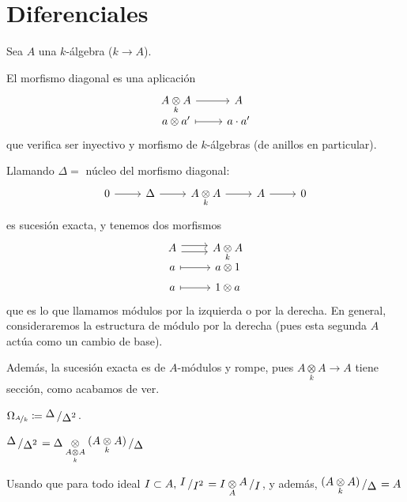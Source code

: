 \section{Diferenciales}
Sea $A$ una $k$-\'algebra ($k \to A$).
\begin{defi}
    El morfismo diagonal es una aplicaci\'on
    $$\bt A \underset{k}{\otimes} A \rar & A \\[-8mm] a\otimes a' \rarmaps & a\cdot a'  \et$$
    que verifica ser inyectivo y morfismo de $k$-\'algebras (de anillos en particular).
\end{defi}
\begin{obs}    
    Llamando $\Delta = $ n\'ucleo del morfismo diagonal:
    $$\bt 0 \rar & \Delta \rar & A \underset{k}{\otimes} A \rar & A \rar & 0 \et$$
    es sucesi\'on exacta, y tenemos dos morfismos
    $$\bt A \rar[shift left=1mm] \rar[shift right=1mm] & A \underset{k}{\otimes} A \\[-8mm] a \rarmaps & a\otimes 1 \\[-5mm] a \rarmaps & 1\otimes a  \et$$
    que es lo que llamamos m\'odulos por la izquierda o por la derecha. En general, consideraremos la estructura de m\'odulo por la derecha (pues esta segunda $A$ act\'ua como un cambio de base).

    Adem\'as, la sucesi\'on exacta es de $A$-m\'odulos y rompe, pues $A \underset{k}{\otimes} A \to A$ tiene secci\'on, como acabamos de ver. 
\end{obs}
\begin{defi}
    $\Omega_{\nicefrac{A}{k}} \coloneq \modulo{\Delta}{\Delta^2} $. 
\end{defi}
\begin{prop}
    $\modulo{\Delta}{\Delta^2} = \Delta \underset{A \underset{k}{\otimes} A}{\otimes} \modulo{(A \underset{k}{\otimes} A)}{\Delta}$
\end{prop}
\begin{dem}
    Usando que para todo ideal $I \subset A, \, \modulo{I}{I^2} = I \underset{A}{\otimes} \modulo{A}{I}$, y adem\'as, $\modulo{(A \underset{k}{\otimes} A)}{\Delta} = A$
\end{dem}
